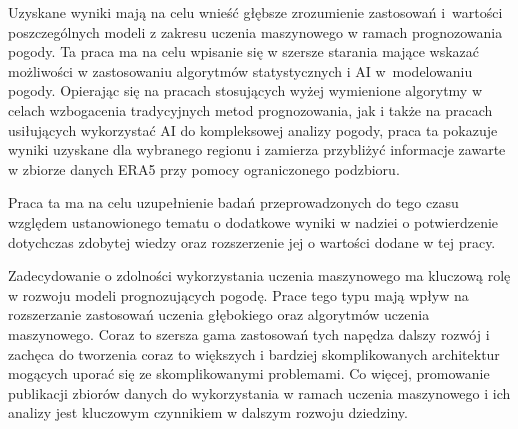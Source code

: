 Uzyskane wyniki mają na celu wnieść głębsze zrozumienie zastosowań i~wartości 
poszczególnych modeli z zakresu uczenia maszynowego w ramach prognozowania pogody.
Ta praca ma na celu wpisanie się w szersze starania mające wskazać możliwości
w zastosowaniu algorytmów statystycznych i AI w~modelowaniu pogody. Opierając
się na pracach stosujących wyżej wymienione algorytmy w celach wzbogacenia
tradycyjnych metod prognozowania, jak i także na pracach usiłujących wykorzystać AI
do kompleksowej analizy pogody, praca ta pokazuje wyniki uzyskane dla wybranego
regionu i zamierza przybliżyć informacje zawarte w zbiorze danych ERA5 przy pomocy
ograniczonego podzbioru.

Praca ta ma na celu uzupełnienie badań przeprowadzonych do tego czasu względem 
ustanowionego tematu o dodatkowe wyniki w nadziei o potwierdzenie dotychczas 
zdobytej wiedzy oraz rozszerzenie jej o wartości dodane w tej pracy.

Zadecydowanie o zdolności wykorzystania uczenia maszynowego ma kluczową rolę w 
rozwoju modeli prognozujących pogodę. Prace tego typu mają wpływ na rozszerzanie
zastosowań uczenia głębokiego oraz algorytmów uczenia maszynowego. Coraz to szersza
gama zastosowań tych napędza dalszy rozwój i zachęca do tworzenia coraz to większych
i bardziej skomplikowanych architektur mogących uporać się ze skomplikowanymi problemami.
Co więcej, promowanie publikacji zbiorów danych do wykorzystania w ramach uczenia
maszynowego i ich analizy jest kluczowym czynnikiem w dalszym rozwoju dziedziny.